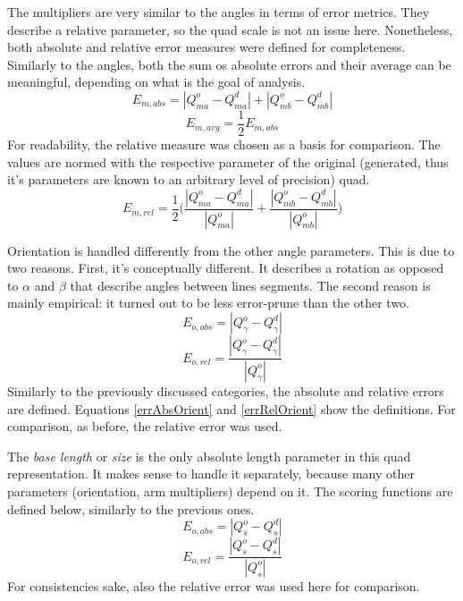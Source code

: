 The multipliers are very similar to the angles in terms of error metrics.
They describe a relative parameter, so the quad scale is not an issue here.
Nonetheless, both absolute and relative error measures were defined for completeness.
Similarly to the angles, both the sum os absolute errors and their average can be meaningful, depending on what is the goal of analysis.
\begin{equation}
E_{m,abs} = |Q_{ma}^o - Q_{ma}^d| + |Q_{mb}^o - Q_{mb}^d|
\label{eq:errAbsSumMul}
\end{equation}
\begin{equation}
E_{m,avg} = \frac{1}{2} E_{m,abs}
\label{eq:errAbsAvgMul}
\end{equation}
For readability, the relative measure was chosen as a basis for comparison.
The values are normed with the respective parameter of the original (generated, thus it's parameters are known to an arbitrary level of precision) quad.
\begin{equation}
E_{m,rel} = \frac{1}{2}\Bigg(\frac{|Q_{ma}^o - Q_{ma}^d|}{|Q_{ma}^o|} + \frac{|Q_{mb}^o - Q_{mb}^d|}{|Q_{mb}^o|}\Bigg)
\label{eq:errRelAvgMul}
\end{equation}

Orientation is handled differently from the other angle parameters.
This is due to two reasons.
First, it's conceptually different.
It describes a rotation as opposed to $\alpha$ and $\beta$ that describe angles between lines segments.
The second reason is mainly empirical: it turned out to be less error-prune than the other two.
\begin{equation}
E_{o,abs} = |Q_\gamma^o - Q_\gamma^d|
\label{eq:errAbsOrient}
\end{equation}
\begin{equation}
E_{o,rel} = \frac{|Q_\gamma^o - Q_\gamma^d|}{|Q_\gamma^o|}
\label{eq:errRelOrient}
\end{equation}
Similarly to the previously discussed categories, the absolute and relative errors are defined.
Equations \eqref{errAbsOrient} and \eqref{errRelOrient} show the definitions.
For comparison, as before, the relative error was used.

The \textit{base length} or \textit{size} is the only absolute length parameter in this quad representation.
It makes sense to handle it separately, because many other parameters (orientation, arm multipliers) depend on it.
The scoring functions are defined below, similarly to the previous ones.
\begin{equation}
E_{o,abs} = |Q_s^o - Q_s^d|
\label{eq:errAbsSize}
\end{equation}
\begin{equation}
E_{o,rel} = \frac{|Q_s^o - Q_s^d|}{|Q_s^o|}
\label{eq:errRelSize}
\end{equation}
For consistencies sake, also the relative error was used here for comparison.

